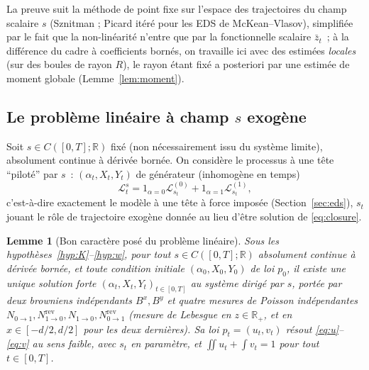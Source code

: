\documentclass[11pt,a4paper]{article}
\newcommand{\ind}[1]{\mathrm{1}_{#1}}
\newcommand{\R}{\mathbb{R}}
\theoremstyle{plain}
\newtheorem{lem}[thm]{Lemme}
\theoremstyle{definition}
\begin{document}
La preuve suit la m\'ethode de point fixe sur l'espace des trajectoires du champ scalaire $s$ (Sznitman ; Picard it\'er\'e pour les EDS de McKean--Vlasov), simplifi\'ee par le fait que la non-lin\'earit\'e n'entre que par la fonctionnelle scalaire $\bar z_t$~; \`a la diff\'erence du cadre \`a coefficients born\'es, on travaille ici avec des estim\'ees \emph{locales} (sur des boules de rayon $R$), le rayon \'etant fix\'e a posteriori par une estim\'ee de moment globale (Lemme~\ref{lem:moment}).

\subsection{Le probl\`eme lin\'eaire \`a champ $s$ exog\`ene}

Soit $s\in C([0,T];\R)$ fix\'e (non n\'ecessairement issu du syst\`eme limite), absolument continue \`a d\'eriv\'ee born\'ee. On consid\`ere le processus \`a une t\^ete ``pilot\'e'' par $s$~: $(\alpha_t,X_t,Y_t)$ de g\'en\'erateur (inhomog\`ene en temps)
\[
\mathcal L_t^s = \ind{\alpha=0}\mathcal L^{(0)}_{s_t} + \ind{\alpha=1}\mathcal L^{(1)}_{s_t},
\]
c'est-\`a-dire exactement le mod\`ele \`a une t\^ete \`a force impos\'ee (Section~\ref{sec:eds}), $s_t$ jouant le r\^ole de trajectoire exog\`ene donn\'ee au lieu d'\^etre solution de \eqref{eq:closure}.

\begin{lem}[Bon caract\`ere pos\'e du probl\`eme lin\'eaire]
\label{lem:linear}
Sous les hypoth\`eses~\ref{hyp:K}--\ref{hyp:w}, pour tout $s\in C([0,T];\R)$ absolument continue \`a d\'eriv\'ee born\'ee, et toute condition initiale $(\alpha_0,X_0,Y_0)$ de loi $p_0$, il existe une unique solution forte $(\alpha_t,X_t,Y_t)_{t\in[0,T]}$ au syst\`eme dirig\'e par $s$, port\'ee par deux browniens ind\'ependants $B^x,B^y$ et quatre mesures de Poisson ind\'ependantes $N_{0\to1},N^{\mathrm{rev}}_{1\to0},N_{1\to0},N^{\mathrm{rev}}_{0\to1}$ (mesure de Lebesgue en $z\in\R_+$, et en $x\in[-d/2,d/2]$ pour les deux derni\`eres). Sa loi $p_t=(u_t,v_t)$ r\'esout \eqref{eq:u}--\eqref{eq:v} au sens faible, avec $s_t$ en param\`etre, et $\iint u_t+\int v_t=1$ pour tout $t\in[0,T]$.
\end{lem}
\end{document}
